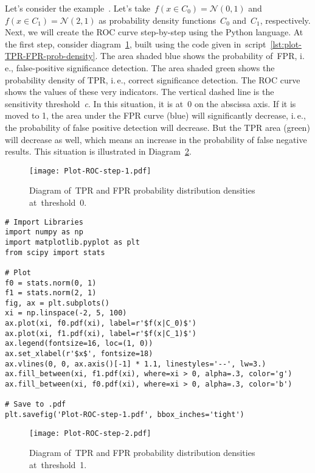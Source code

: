 \documentclass[]{scrreprt}
\begin{document}
Let's consider the example~\cite{AUC-Derivation}. Let's take~$f(x\in C_{0}) = \mathcal{N}(0,1)$ and~$f(x\in C_{1}) = \mathcal{N}(2,1)$ as probability density functions~$C_{0}$ and~$C_{1}$, respectively. Next, we will create the ROC curve step-by-step using the Python language. At the first step, consider diagram~\ref{fig:plot-TPR-FPR-prob-density-1}, built using the code given in~script~\ref{lst:plot-TPR-FPR-prob-density}. The area shaded blue shows the probability of~FPR, i.\,e., false-positive significance detection. The area shaded green shows the probability density of TPR, i.\,e., correct significance detection. The ROC curve shows the values of these very indicators. The vertical dashed line is the sensitivity threshold~\textit{c}. In this situation, it is at~0 on the abscissa axis. If it is moved to 1, the area under the FPR curve (blue) will significantly decrease, i.\,e., the probability of false positive detection will decrease. But the TPR area (green) will decrease as well, which means an increase in the probability of false negative results. This situation is illustrated in Diagram~\ref{fig:plot-TPR-FPR-prob-density-2}.
%
\begin{figure}[htp]
	\centering
	\texttt{[image: Plot-ROC-step-1.pdf]}
	\caption{Diagram of~TPR and FPR probability distribution densities at~threshold~0.}
	\label{fig:plot-TPR-FPR-prob-density-1}
\end{figure}
%
\begin{lstlisting}[float=htp, caption = Plotting TPR and FPR probability density functions, firstnumber=1, label= lst:plot-TPR-FPR-prob-density]
# Import Libraries
import numpy as np
import matplotlib.pyplot as plt
from scipy import stats

# Plot
f0 = stats.norm(0, 1)
f1 = stats.norm(2, 1)
fig, ax = plt.subplots()
xi = np.linspace(-2, 5, 100)
ax.plot(xi, f0.pdf(xi), label=r'$f(x|C_0)$')
ax.plot(xi, f1.pdf(xi), label=r'$f(x|C_1)$')
ax.legend(fontsize=16, loc=(1, 0))
ax.set_xlabel(r'$x$', fontsize=18)
ax.vlines(0, 0, ax.axis()[-1] * 1.1, linestyles='--', lw=3.)
ax.fill_between(xi, f1.pdf(xi), where=xi > 0, alpha=.3, color='g')
ax.fill_between(xi, f0.pdf(xi), where=xi > 0, alpha=.3, color='b')

# Save to .pdf
plt.savefig('Plot-ROC-step-1.pdf', bbox_inches='tight')

\end{lstlisting}
%
\begin{figure}[htp]
	\centering
	\texttt{[image: Plot-ROC-step-2.pdf]}
	\caption{Diagram of~TPR and FPR probability distribution densities at~threshold~1.}
	\label{fig:plot-TPR-FPR-prob-density-2}
\end{figure}
\end{document}
